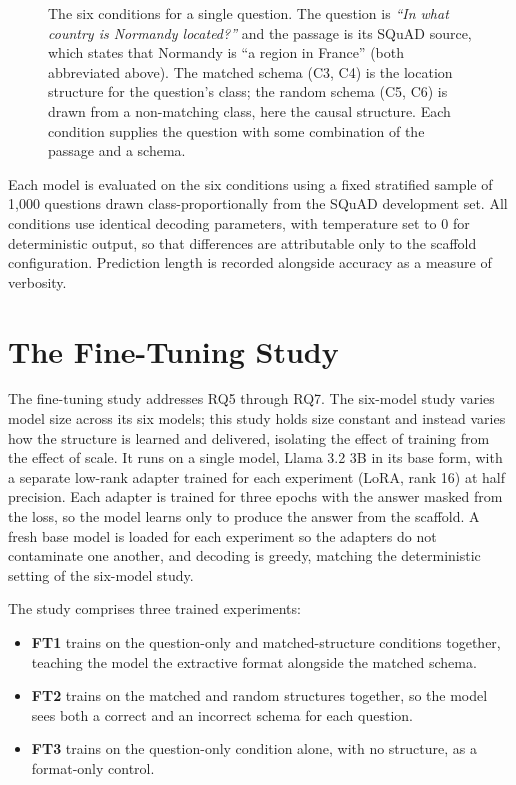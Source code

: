 \documentclass[master]{thesis}
\begin{document}
\begin{figure}[ht]
\caption{The six conditions for a single question. The question is \textit{``In what country is Normandy located?''} and the passage is its SQuAD source, which states that Normandy is ``a region in France'' (both abbreviated above). The matched schema (C3, C4) is the location structure for the question's class; the random schema (C5, C6) is drawn from a non-matching class, here the causal structure. Each condition supplies the question with some combination of the passage and a schema.}
\label{fig:six_conditions}
\end{figure}

Each model is evaluated on the six conditions using a fixed stratified sample of 1,000 questions drawn class-proportionally from the SQuAD development set. All conditions use identical decoding parameters, with temperature set to 0 for deterministic output, so that differences are attributable only to the scaffold configuration. Prediction length is recorded alongside accuracy as a measure of verbosity.

\section{The Fine-Tuning Study}

The fine-tuning study addresses RQ5 through RQ7. The six-model study varies model size across its six models; this study holds size constant and instead varies how the structure is learned and delivered, isolating the effect of training from the effect of scale. It runs on a single model, Llama 3.2 3B in its base form, with a separate low-rank adapter trained for each experiment (LoRA, rank 16) at half precision. Each adapter is trained for three epochs with the answer masked from the loss, so the model learns only to produce the answer from the scaffold. A fresh base model is loaded for each experiment so the adapters do not contaminate one another, and decoding is greedy, matching the deterministic setting of the six-model study.

The study comprises three trained experiments:

\begin{itemize}
  \item \textbf{FT1} trains on the question-only and matched-structure conditions together, teaching the model the extractive format alongside the matched schema.
  \item \textbf{FT2} trains on the matched and random structures together, so the model sees both a correct and an incorrect schema for each question.
  \item \textbf{FT3} trains on the question-only condition alone, with no structure, as a format-only control.
\end{itemize}
\end{document}
